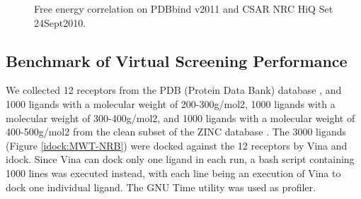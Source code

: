 \begin{figure}
\centering
{}
\caption{Free energy correlation on PDBbind v2011 and CSAR NRC HiQ Set 24Sept2010.}
\label{idock:FECorrelation}
\end{figure}

\subsection{Benchmark of Virtual Screening Performance}

We collected 12 receptors from the PDB (Protein Data Bank) database \cite{540,537}, and 1000 ligands with a molecular weight of 200-300g/mol2, 1000 ligands with a molecular weight of 300-400g/mol2, and 1000 ligands with a molecular weight of 400-500g/mol2 from the clean subset of the ZINC database \cite{532,1178}. The 3000 ligands (Figure \ref{idock:MWT-NRB}) were docked against the 12 receptors by Vina and idock. Since Vina can dock only one ligand in each run, a bash script containing 1000 lines was executed instead, with each line being an execution of Vina to dock one individual ligand. The GNU Time utility was used as profiler.

